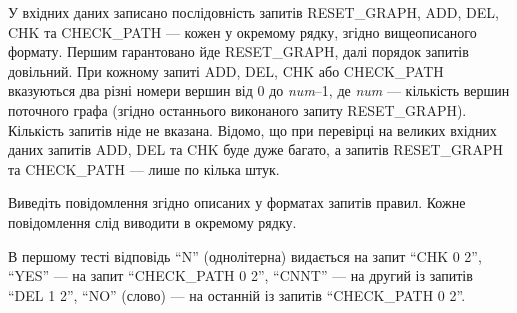 \InputFile
У вхідних даних записано послідовність запитів RESET\_GRAPH, ADD, DEL, CHK та CHECK\_PATH --- кожен у окремому рядку, згідно вищеописаного формату. Першим гарантовано йде RESET\_GRAPH, далі порядок запитів довільний. При кожному запиті ADD, DEL, CHK або CHECK\_PATH вказуються два різні номери вершин від 0 до {\it num}–1, де {\it num} --- кількість вершин поточного графа (згідно останнього виконаного запиту RESET\_GRAPH). Кількість запитів ніде не вказана. Відомо, що при перевірці на великих вхідних даних запитів ADD, DEL та CHK буде дуже багато, а запитів RESET\_GRAPH та CHECK\_PATH — лише по кілька штук.

\OutputFile
Виведіть повідомлення згідно описаних у форматах запитів правил. Кожне повідомлення слід виводити в окремому рядку.


\Examples

\begin{example}
\end{example}
             

\Note

В першому тесті відповідь ``N'' (однолітерна) видається на запит ``CHK 0 2'', ``YES'' — на запит ``CHECK\_PATH 0 2'', ``CNNT'' — на другий із запитів ``DEL 1 2'', ``NO'' (слово) — на останній із запитів ``CHECK\_PATH 0 2''. 